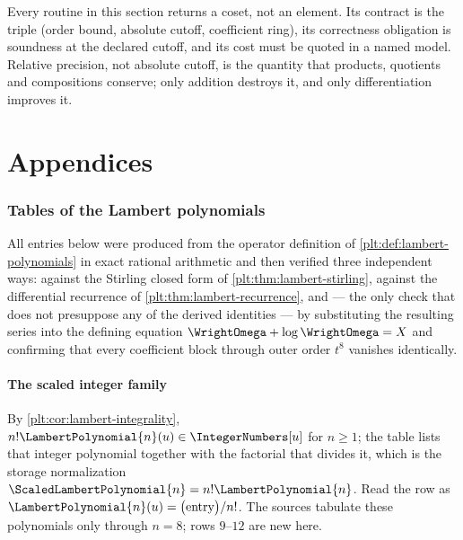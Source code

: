 \documentclass[11pt,oneside]{article}
\theoremstyle{plain}
\theoremstyle{definition}
\theoremstyle{remark}
\newcommand{\LamP}[1]{\LambertPolynomial{#1}}
\newcommand{\LamPsc}[1]{\ScaledLambertPolynomial{#1}}
\begin{document}
\begin{summarybox}
Every routine in this section returns a coset, not an element.  Its contract is
the triple (order bound, absolute cutoff, coefficient ring), its correctness
obligation is soundness at the declared cutoff, and its cost must be quoted in
a named model.  Relative precision, not absolute cutoff, is the quantity that
products, quotients and compositions conserve; only addition destroys it, and
only differentiation improves it.
\end{summarybox}

\clearpage
\appendix
\part*{Appendices}

\section{Tables of the Lambert polynomials}
\label{plt:sec:lambert-tables}

All entries below were produced from the operator definition of
\cref{plt:def:lambert-polynomials} in exact rational arithmetic and then
verified three independent ways: against the Stirling closed form of
\cref{plt:thm:lambert-stirling}, against the differential recurrence of
\cref{plt:thm:lambert-recurrence}, and --- the only check that does not
presuppose any of the derived identities --- by substituting the resulting
series into the defining equation
\(\WrightOmega+\log\WrightOmega=X\) and confirming that every coefficient block
through outer order \(t^{8}\) vanishes identically.

\subsection{The scaled integer family}

By \cref{plt:cor:lambert-integrality}, \(n!\LamP{n}(u)\in\IntegerNumbers[u]\)
for \(n\ge1\); the table lists that integer polynomial together with the
factorial that divides it, which is the storage normalization
\(\LamPsc{n}=n!\LamP{n}\).  Read the row as
\(\LamP{n}(u)=\bigl(\text{entry}\bigr)/n!\).  The sources tabulate these
polynomials only through \(n=8\); rows \(9\)--\(12\) are new here.
\end{document}
